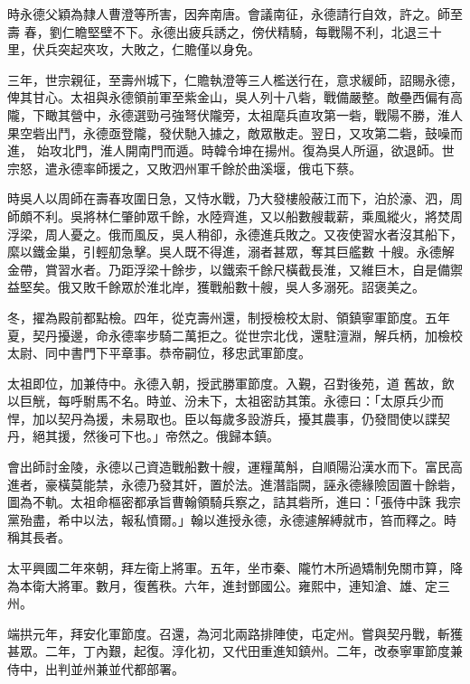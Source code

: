 \begin{pinyinscope}
 時永德父穎為隸人曹澄等所害，因奔南唐。會議南征，永德請行自效，許之。師至壽
 春，劉仁瞻堅壁不下。永德出疲兵誘之，傍伏精騎，每戰陽不利，北退三十里，伏兵突起夾攻，大敗之，仁贍僅以身免。



 三年，世宗親征，至壽州城下，仁贍執澄等三人檻送行在，意求緩師，詔賜永德，俾其甘心。太祖與永德領前軍至紫金山，吳人列十八砦，戰備嚴整。敵壘西偏有高隴，下瞰其營中，永德選勁弓強弩伏隴旁，太祖麾兵直攻第一砦，戰陽不勝，淮人果空砦出鬥，永德亟登隴，發伏馳入據之，敵眾散走。翌日，又攻第二砦，鼓噪而進，
 始攻北門，淮人開南門而遁。時韓令坤在揚州。復為吳人所逼，欲退師。世宗怒，遣永德率師援之，又敗泗州軍千餘於曲溪堰，俄屯下蔡。



 時吳人以周師在壽春攻圍日急，又恃水戰，乃大發樓般蔽江而下，泊於濠、泗，周師頗不利。吳將林仁肇帥眾千餘，水陸齊進，又以船數艘載薪，乘風縱火，將焚周浮梁，周人憂之。俄而風反，吳人稍卻，永德進兵敗之。又夜使習水者沒其船下，縻以鐵金巢，引輕舠急擊。吳人既不得進，溺者甚眾，奪其巨艦數
 十艘。永德解金帶，賞習水者。乃距浮梁十餘步，以鐵索千餘尺橫截長淮，又維巨木，自是備禦益堅矣。俄又敗千餘眾於淮北岸，獲戰船數十艘，吳人多溺死。詔褒美之。



 冬，擢為殿前都點檢。四年，從克壽州還，制授檢校太尉、領鎮寧軍節度。五年夏，契丹擾邊，命永德率步騎二萬拒之。從世宗北伐，還駐澶淵，解兵柄，加檢校太尉、同中書門下平章事。恭帝嗣位，移忠武軍節度。



 太祖即位，加兼侍中。永德入朝，授武勝軍節度。入覲，召對後苑，道
 舊故，飲以巨觥，每呼駙馬不名。時並、汾未下，太祖密訪其策。永德曰：「太原兵少而悍，加以契丹為援，未易取也。臣以每歲多設游兵，擾其農事，仍發間使以諜契丹，絕其援，然後可下也。」帝然之。俄歸本鎮。



 會出師討金陵，永德以己資造戰船數十艘，運糧萬斛，自順陽沿漢水而下。富民高進者，豪橫莫能禁，永德乃發其奸，置於法。進潛詣闕，誣永德緣險固置十餘砦，圖為不軌。太祖命樞密都承旨曹翰領騎兵察之，詰其砦所，進曰：「張侍中誅
 我宗黨殆盡，希中以法，報私憤爾。」翰以進授永德，永德遽解縛就市，笞而釋之。時稱其長者。



 太平興國二年來朝，拜左衛上將軍。五年，坐市秦、隴竹木所過矯制免關市算，降為本衛大將軍。數月，復舊秩。六年，進封鄧國公。雍熙中，連知滄、雄、定三州。



 端拱元年，拜安化軍節度。召還，為河北兩路排陣使，屯定州。嘗與契丹戰，斬獲甚眾。二年，丁內艱，起復。淳化初，又代田重進知鎮州。二年，改泰寧軍節度兼侍中，出判並州兼並代都部署。




\end{pinyinscope}
